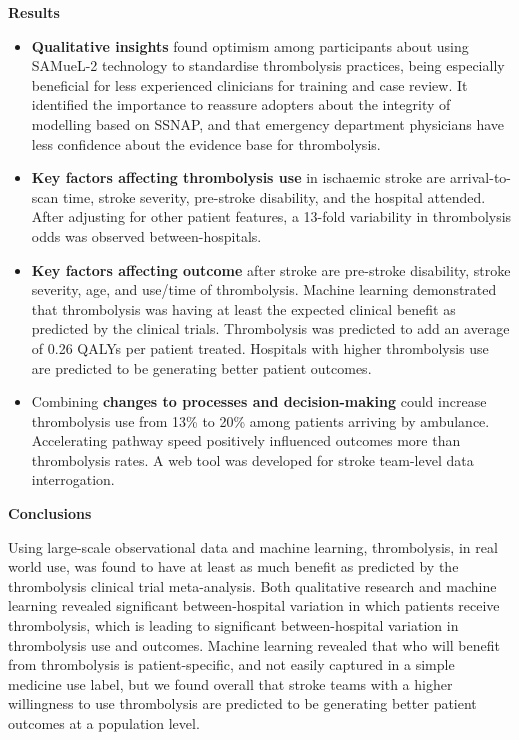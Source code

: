 \textbf{Results}

\begin{itemize}

    \item \textbf{Qualitative insights} found optimism among participants about using SAMueL-2 technology to standardise thrombolysis practices, being especially beneficial for less experienced clinicians for training and case review. It identified the importance to reassure adopters about the integrity of modelling based on SSNAP, and that emergency department physicians have less confidence about the evidence base for thrombolysis.
    
    \item \textbf{Key factors affecting thrombolysis use} in ischaemic stroke are arrival-to-scan time, stroke severity, pre-stroke disability, and the hospital attended. After adjusting for other patient features, a 13-fold variability in thrombolysis odds was observed between-hospitals.
    
    \item \textbf{Key factors affecting outcome} after stroke are pre-stroke disability, stroke severity, age, and use/time of thrombolysis. Machine learning demonstrated that thrombolysis was having at least the expected clinical benefit as predicted by the clinical trials. Thrombolysis was predicted to add an average of 0.26 QALYs per patient treated. Hospitals with higher thrombolysis use are predicted to be generating better patient outcomes.
    
    \item Combining \textbf{changes to processes and decision-making} could increase thrombolysis use from 13\% to 20\% among patients arriving by ambulance. Accelerating pathway speed positively influenced outcomes more than thrombolysis rates. A web tool was developed for stroke team-level data interrogation.

    \end{itemize}

\textbf{Conclusions}

Using large-scale observational data and machine learning, thrombolysis, in real world use, was found to have at least as much benefit as predicted by the thrombolysis clinical trial meta-analysis. Both qualitative research and machine learning revealed significant between-hospital variation in which patients receive thrombolysis, which is leading to significant between-hospital variation in thrombolysis use and outcomes. Machine learning revealed that who will benefit from thrombolysis is patient-specific, and not easily captured in a simple medicine use label, but we found overall that stroke teams with a higher willingness to use thrombolysis are predicted to be generating better patient outcomes at a population level.

